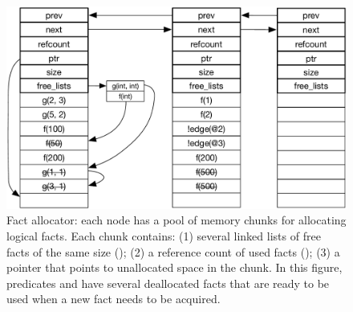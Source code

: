 \begin{figure}[ht]
   \begin{center}
      \includegraphics[width=0.7\linewidth]{figures/implementation/fact_allocator.pdf}
   \end{center}
   \caption{Fact allocator: each node has a pool of memory chunks for allocating
      logical facts. Each chunk contains: (1) several linked lists of free facts
      of the same size (); (2) a reference count of used facts
      (); (3) a  pointer that points to unallocated
      space in the chunk. In this figure, predicates  and  have
   several deallocated facts that are ready to be used when a new fact needs to
be acquired.}
   \label{fig:implementation:fact_allocator}
\end{figure}
\fi
